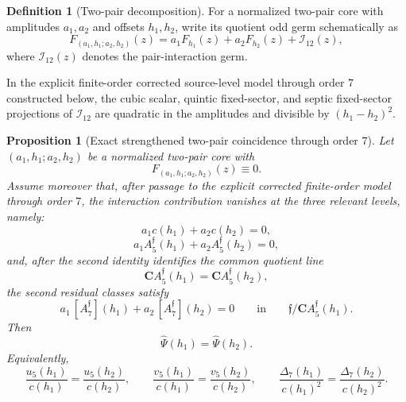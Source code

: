 \documentclass[11pt,a4paper]{amsart}
\theoremstyle{plain}
\newtheorem{proposition}[theorem]{Proposition}
\theoremstyle{definition}
\newtheorem{definition}[theorem]{Definition}
\begin{document}
\begin{definition}[Two-pair decomposition]
\label{def:two-pair-decomposition}
For a normalized two-pair core with amplitudes $a_1,a_2$ and offsets
$h_1,h_2$, write its quotient odd germ schematically as
\[
F_{(a_1,h_1;a_2,h_2)}(z)
=
a_1F_{h_1}(z)+a_2F_{h_2}(z)+\mathcal I_{12}(z),
\]
where $\mathcal I_{12}(z)$ denotes the pair-interaction germ.

In the explicit finite-order corrected source-level model through order $7$
constructed below, the cubic scalar, quintic fixed-sector, and septic
fixed-sector projections of $\mathcal I_{12}$ are quadratic in the amplitudes
and divisible by $(h_1-h_2)^2$.
\end{definition}

\begin{proposition}[Exact strengthened two-pair coincidence through order $7$]
\label{prop:exact-strengthened-two-pair-coincidence}
Let $(a_1,h_1;a_2,h_2)$ be a normalized two-pair core with
\[
F_{(a_1,h_1;a_2,h_2)}(z)\equiv 0.
\]
Assume moreover that, after passage to the explicit corrected finite-order model
through order $7$, the interaction contribution vanishes at the three
relevant levels, namely:
\[
a_1c(h_1)+a_2c(h_2)=0,
\]
\[
a_1A_5^{\mathfrak f}(h_1)+a_2A_5^{\mathfrak f}(h_2)=0,
\]
and, after the second identity identifies the common quotient line
\[
\mathbf C A_5^{\mathfrak f}(h_1)=\mathbf C A_5^{\mathfrak f}(h_2),
\]
the second residual classes satisfy
\[
a_1\,[A_7^{\mathfrak f}](h_1)+a_2\,[A_7^{\mathfrak f}](h_2)=0
\qquad\text{in}\qquad
\mathfrak f/\mathbf C A_5^{\mathfrak f}(h_1).
\]
Then
\[
\widehat\Psi(h_1)=\widehat\Psi(h_2).
\]
Equivalently,
\[
\frac{u_5(h_1)}{c(h_1)}=\frac{u_5(h_2)}{c(h_2)},
\qquad
\frac{v_5(h_1)}{c(h_1)}=\frac{v_5(h_2)}{c(h_2)},
\qquad
\frac{\Delta_7(h_1)}{c(h_1)^2}=\frac{\Delta_7(h_2)}{c(h_2)^2}.
\]
\end{proposition}
\end{document}
